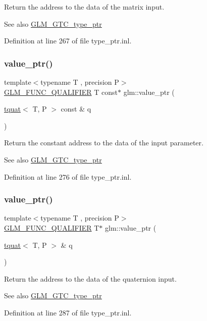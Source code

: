 Return the address to the data of the matrix input. \begin{DoxySeeAlso}{See also}
\mbox{\hyperlink{group__gtc__type__ptr}{G\+L\+M\+\_\+\+G\+T\+C\+\_\+type\+\_\+ptr}} 
\end{DoxySeeAlso}


Definition at line 267 of file type\+\_\+ptr.\+inl.

\mbox{\label{group__gtc__type__ptr_ga26a38ff14840b35c57fa937711c5168c}} 
\subsubsection{\texorpdfstring{value\_ptr()}{value\_ptr()}\hspace{0.1cm}{\footnotesize\ttfamily [26/27]}}
{\footnotesize\ttfamily template$<$typename T , precision P$>$ \\
\mbox{\hyperlink{setup_8hpp_a33fdea6f91c5f834105f7415e2a64407}{G\+L\+M\+\_\+\+F\+U\+N\+C\+\_\+\+Q\+U\+A\+L\+I\+F\+I\+ER}} T const$\ast$ glm\+::value\+\_\+ptr (\begin{DoxyParamCaption}\item[{\mbox{\hyperlink{structglm_1_1tquat}{tquat}}$<$ T, P $>$ const \&}]{q }\end{DoxyParamCaption})}

Return the constant address to the data of the input parameter. \begin{DoxySeeAlso}{See also}
\mbox{\hyperlink{group__gtc__type__ptr}{G\+L\+M\+\_\+\+G\+T\+C\+\_\+type\+\_\+ptr}} 
\end{DoxySeeAlso}


Definition at line 276 of file type\+\_\+ptr.\+inl.

\mbox{\label{group__gtc__type__ptr_ga637414d7a9e8877e66a59f3b3d700898}} 
\subsubsection{\texorpdfstring{value\_ptr()}{value\_ptr()}\hspace{0.1cm}{\footnotesize\ttfamily [27/27]}}
{\footnotesize\ttfamily template$<$typename T , precision P$>$ \\
\mbox{\hyperlink{setup_8hpp_a33fdea6f91c5f834105f7415e2a64407}{G\+L\+M\+\_\+\+F\+U\+N\+C\+\_\+\+Q\+U\+A\+L\+I\+F\+I\+ER}} T$\ast$ glm\+::value\+\_\+ptr (\begin{DoxyParamCaption}\item[{\mbox{\hyperlink{structglm_1_1tquat}{tquat}}$<$ T, P $>$ \&}]{q }\end{DoxyParamCaption})}

Return the address to the data of the quaternion input. \begin{DoxySeeAlso}{See also}
\mbox{\hyperlink{group__gtc__type__ptr}{G\+L\+M\+\_\+\+G\+T\+C\+\_\+type\+\_\+ptr}} 
\end{DoxySeeAlso}


Definition at line 287 of file type\+\_\+ptr.\+inl.

